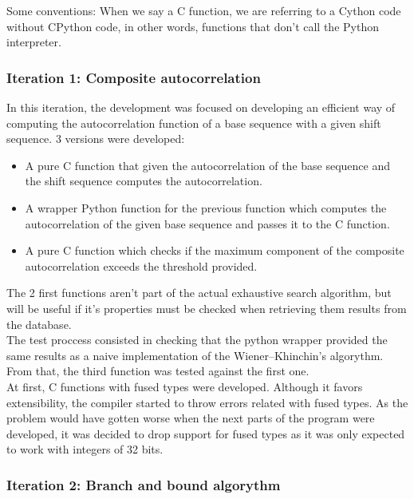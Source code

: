       Some conventions: When we say a C function, we are referring to a Cython
      code without CPython code, in other words, functions that don't call
      the Python interpreter.

      \subsubsection{Iteration 1: Composite autocorrelation}

      In this iteration, the development was focused on developing an efficient
      way of computing the autocorrelation function of a base sequence with a
      given shift sequence. 3 versions were developed:
      \begin{itemize}
        \item A pure C function that given the autocorrelation of the base
        sequence and the shift sequence computes the autocorrelation.
        \item A wrapper Python function for the previous function which
        computes the autocorrelation of the given base sequence and passes it
        to the C function.
        \item A pure C function which checks if the maximum component of the
        composite autocorrelation exceeds the threshold provided.
      \end{itemize}

      The 2 first functions aren't part of the actual exhaustive search
      algorithm, but will be useful if it's properties
      must be checked when retrieving them results from the database. \\

      The test proccess consisted in checking that the python wrapper provided
      the same results as a naive implementation of the Wiener–Khinchin's
      algorythm. From that, the third function was tested against the first
      one.\\

      At first, C functions with fused types were developed. Although it
      favors extensibility, the compiler started to throw errors related with
      fused types. As the problem would have gotten worse when the next parts of
      the program were developed, it was decided to drop support for fused types
      as it was only expected to work with integers of 32 bits.\\

      \subsubsection{Iteration 2: Branch and bound algorythm}


